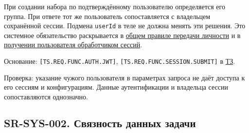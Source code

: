 \documentclass[12pt,a4paper]{article}
\begin{document}
При создании набора по подтверждённому пользователю определяется его группа. При ответе тот же пользователь сопоставляется с владельцем сохранённой сессии. Подмена \texttt{userId} в теле не должна менять эти решения. Это системное обязательство раскрывается в \href{../07_\%D0\%9F\%D1\%80\%D0\%BE\%D0\%B3\%D1\%80\%D0\%B0\%D0\%BC\%D0\%BC\%D0\%BD\%D1\%8B\%D0\%B5_\%D1\%82\%D1\%80\%D0\%B5\%D0\%B1\%D0\%BE\%D0\%B2\%D0\%B0\%D0\%BD\%D0\%B8\%D1\%8F/DOC-06_\%D0\%9F\%D1\%80\%D0\%BE\%D0\%B3\%D1\%80\%D0\%B0\%D0\%BC\%D0\%BC\%D0\%BD\%D1\%8B\%D0\%B5_\%D1\%82\%D1\%80\%D0\%B5\%D0\%B1\%D0\%BE\%D0\%B2\%D0\%B0\%D0\%BD\%D0\%B8\%D1\%8F.pdf\#nameddest=swr-sys-001-\%D0\%BF\%D0\%B5\%D1\%80\%D0\%B5\%D0\%B4\%D0\%B0\%D1\%87\%D0\%B0-\%D0\%BB\%D0\%B8\%D1\%87\%D0\%BD\%D0\%BE\%D1\%81\%D1\%82\%D0\%B8-\%D0\%BF\%D0\%BE\%D0\%BB\%D1\%8C\%D0\%B7\%D0\%BE\%D0\%B2\%D0\%B0\%D1\%82\%D0\%B5\%D0\%BB\%D1\%8F}{общем правиле передачи личности} и в \href{../07_\%D0\%9F\%D1\%80\%D0\%BE\%D0\%B3\%D1\%80\%D0\%B0\%D0\%BC\%D0\%BC\%D0\%BD\%D1\%8B\%D0\%B5_\%D1\%82\%D1\%80\%D0\%B5\%D0\%B1\%D0\%BE\%D0\%B2\%D0\%B0\%D0\%BD\%D0\%B8\%D1\%8F/DOC-06.2_\%D0\%A1\%D0\%B5\%D1\%81\%D1\%81\%D0\%B8\%D0\%B8_\%D0\%B7\%D0\%B0\%D0\%B4\%D0\%B0\%D1\%87_\%D0\%B8_\%D0\%BF\%D0\%BB\%D0\%B0\%D0\%BD\%D0\%B8\%D1\%80\%D0\%BE\%D0\%B2\%D1\%89\%D0\%B8\%D0\%BA.pdf\#nameddest=swr-ses-001-\%D0\%BF\%D0\%BE\%D0\%BB\%D1\%83\%D1\%87\%D0\%B5\%D0\%BD\%D0\%B8\%D0\%B5-\%D0\%BF\%D0\%BE\%D0\%BB\%D1\%8C\%D0\%B7\%D0\%BE\%D0\%B2\%D0\%B0\%D1\%82\%D0\%B5\%D0\%BB\%D1\%8F}{получении пользователя обработчиком сессий}.

Основание: \texttt{[TS.\allowbreak{}REQ.\allowbreak{}FUNC.\allowbreak{}AUTH.\allowbreak{}JWT]}, \texttt{[TS.\allowbreak{}REQ.\allowbreak{}FUNC.\allowbreak{}SESSION.\allowbreak{}SUBMIT]} в \href{../02_\%D0\%A2\%D0\%B5\%D1\%85\%D0\%BD\%D0\%B8\%D1\%87\%D0\%B5\%D1\%81\%D0\%BA\%D0\%BE\%D0\%B5_\%D0\%B7\%D0\%B0\%D0\%B4\%D0\%B0\%D0\%BD\%D0\%B8\%D0\%B5/\%D0\%A2\%D0\%B5\%D1\%85\%D0\%BD\%D0\%B8\%D1\%87\%D0\%B5\%D1\%81\%D0\%BA\%D0\%BE\%D0\%B5_\%D0\%B7\%D0\%B0\%D0\%B4\%D0\%B0\%D0\%BD\%D0\%B8\%D0\%B5.pdf}{ТЗ}.

Проверка: указание чужого пользователя в параметрах запроса не даёт доступа к его сессиям и конфигурациям. Данные аутентификации и владельца сессии сопоставляются однозначно.

\subsection{SR-SYS-002. Связность данных задачи}\label{sr-sys-002-ux441ux432ux44fux437ux43dux43eux441ux442ux44c-ux434ux430ux43dux43dux44bux445-ux437ux430ux434ux430ux447ux438}
\end{document}
